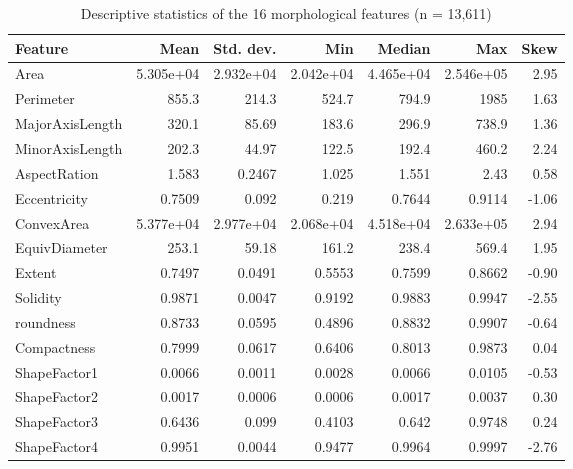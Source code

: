 \begin{table}[htbp]
\centering
\footnotesize
\caption{Descriptive statistics of the 16 morphological features (n = 13,611)}
\label{tab:descriptive}
\begin{tabular}{lrrrrrr}
\toprule
Feature & Mean & Std. dev. & Min & Median & Max & Skew \\
\midrule
Area & 5.305e+04 & 2.932e+04 & 2.042e+04 & 4.465e+04 & 2.546e+05 & 2.95 \\
Perimeter & 855.3 & 214.3 & 524.7 & 794.9 & 1985 & 1.63 \\
MajorAxisLength & 320.1 & 85.69 & 183.6 & 296.9 & 738.9 & 1.36 \\
MinorAxisLength & 202.3 & 44.97 & 122.5 & 192.4 & 460.2 & 2.24 \\
AspectRation & 1.583 & 0.2467 & 1.025 & 1.551 & 2.43 & 0.58 \\
Eccentricity & 0.7509 & 0.092 & 0.219 & 0.7644 & 0.9114 & -1.06 \\
ConvexArea & 5.377e+04 & 2.977e+04 & 2.068e+04 & 4.518e+04 & 2.633e+05 & 2.94 \\
EquivDiameter & 253.1 & 59.18 & 161.2 & 238.4 & 569.4 & 1.95 \\
Extent & 0.7497 & 0.0491 & 0.5553 & 0.7599 & 0.8662 & -0.90 \\
Solidity & 0.9871 & 0.0047 & 0.9192 & 0.9883 & 0.9947 & -2.55 \\
roundness & 0.8733 & 0.0595 & 0.4896 & 0.8832 & 0.9907 & -0.64 \\
Compactness & 0.7999 & 0.0617 & 0.6406 & 0.8013 & 0.9873 & 0.04 \\
ShapeFactor1 & 0.0066 & 0.0011 & 0.0028 & 0.0066 & 0.0105 & -0.53 \\
ShapeFactor2 & 0.0017 & 0.0006 & 0.0006 & 0.0017 & 0.0037 & 0.30 \\
ShapeFactor3 & 0.6436 & 0.099 & 0.4103 & 0.642 & 0.9748 & 0.24 \\
ShapeFactor4 & 0.9951 & 0.0044 & 0.9477 & 0.9964 & 0.9997 & -2.76 \\
\bottomrule
\end{tabular}
\end{table}
